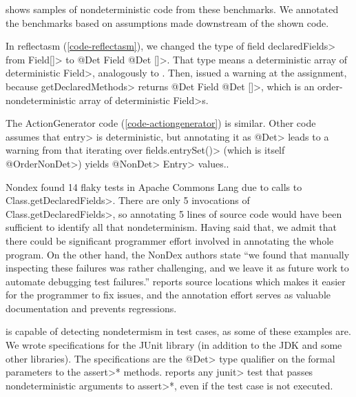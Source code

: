  shows samples of nondeterministic code from these
benchmarks.
We annotated the benchmarks based on 
assumptions made downstream of the shown code.

In reflectasm (\cref{code-reflectasm}), we changed the type of field
\<declaredFields> from \<Field[]> to \<@Det Field @Det []>.  That type
means a deterministic array of deterministic \<Field>, analogously to
.  Then, \theDeterminismChecker issued a
warning at the assignment, because \<getDeclaredMethods> returns \<@Det
Field @Det []>, which is an order-nondeterministic array of deterministic
\<Field>s.

The ActionGenerator code (\cref{code-actiongenerator}) is similar.  Other
code assumes that \<entry> is deterministic, but annotating it as \<@Det>
leads to a warning from \theDeterminismChecker that iterating over
\<fields.entrySet()> (which is itself \<@OrderNonDet>) yields \<@NonDet>
\<Entry> values..

Nondex found 14 flaky tests in Apache Commons Lang due to calls
to \<Class.getDeclaredFields>. 
There are only 5 invocations of \<Class.getDeclaredFields>, so annotating 5 lines of source code
would have been sufficient to identify all that nondeterminism.
Having said that, we admit that there could be
significant programmer effort involved in annotating the whole program. On
the other hand, the NonDex authors
state ``we found that manually inspecting these failures was
rather challenging, and we leave it as future work to automate
debugging test failures.''
\TheDeterminismChecker reports source locations
which makes it easier for the programmer to fix issues, and the annotation
effort serves as valuable documentation and prevents regressions.

\TheDeterminismChecker is capable of detecting nondetermism in test
cases, as some of these examples are.
We wrote specifications for the
JUnit library (in addition to the JDK and some other libraries).
The specifications are the \<@Det> type qualifier on the formal parameters
to the \<assert>* methods.
\TheDeterminismChecker reports any \<junit> test that passes nondeterministic arguments to
\<assert>*, even if the test case is not executed.


